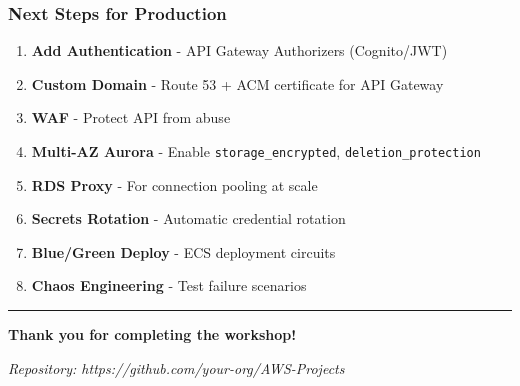 \hypertarget{next-steps-for-production}{%
\subsubsection{Next Steps for
Production}}

\begin{enumerate}
\def\labelenumi{\arabic{enumi}.}
\tightlist
\item
  \textbf{Add Authentication} - API Gateway Authorizers (Cognito/JWT)
\item
  \textbf{Custom Domain} - Route 53 + ACM certificate for API Gateway
\item
  \textbf{WAF} - Protect API from abuse
\item
  \textbf{Multi-AZ Aurora} - Enable \texttt{storage\_encrypted},
  \texttt{deletion\_protection}
\item
  \textbf{RDS Proxy} - For connection pooling at scale
\item
  \textbf{Secrets Rotation} - Automatic credential rotation
\item
  \textbf{Blue/Green Deploy} - ECS deployment circuits
\item
  \textbf{Chaos Engineering} - Test failure scenarios
\end{enumerate}

\begin{center}\rule{0.5\linewidth}{0.5pt}\end{center}

\textbf{Thank you for completing the workshop!}

\emph{Repository: https://github.com/your-org/AWS-Projects}
